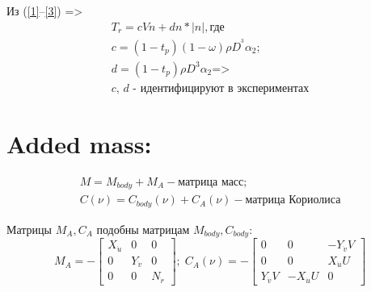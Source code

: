 \noindent{\rule{4cm}{0.4pt}}

Из (\ref{1}--\ref{3}) => 
\begin{eqnarray*}
    T_r = cVn + dn*|n|, \textit{где } \\
    c = (1-t_p)(1-\omega)\rho D^^3 \alpha_2; \\
    d = (1-t_p)\rho D^3 \alpha_2 \textit{=>} \\
    \textit{c, d - идентифицируют в экспериментах}
\end{eqnarray*}


\section*{Added mass:}

\begin{eqnarray*}
    M = M_{body} + M_A - \textit{матрица масс}; \\
    C(\nu) = C_{body}(\nu) + C_A(\nu) - \textit{матрица Кориолиса}
\end{eqnarray*}

Матрицы ${M_A, C_A}$ подобны матрицам ${M_{body}, C_{body}}$: \\
\begin{equation*}
    M_A = - \begin{bmatrix}  
                X_{\Dot{u}} & 0 & 0 \\
                0 & Y_{\Dot{v}} & 0 \\
                0 & 0 & N_{\Dot{r}}
            \end{bmatrix}; 
            \;
        C_A(\nu) = - \begin{bmatrix}
                    0 & 0 & -Y_{\Dot{v}}V \\
                    0 & 0 & X_{\Dot{u}}U \\
                    Y_{\Dot{v}}V & -X_{\Dot{u}}U & 0
                \end{bmatrix}
\end{equation*}
